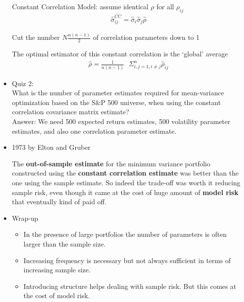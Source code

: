 \documentclass{maths}
\begin{document}
\begin{itemize}
Constant Correlation Model: assume identical $\rho$ for all $\rho_{ij}$
\begin{align*}
\hat{\sigma}_{ij}^{CC} = \hat{\sigma}_{i}\hat{\sigma}_{j}\hat{\rho}
\end{align*}

Cut the number $N\frac{n(n-1)}{2}$ of correlation parameters down to 1

The optimal estimator of this constant correlation is the `global' average
\begin{align*}
\hat{\rho}=\frac{1}{n(n-1)}\text{ }\Sigma_{i,j=1,i \neq j}^{n}\hat{\rho}_{ij}
\end{align*}


\item Quiz 2:\\ What is the number of parameter estimates required for mean-variance optimization based on the S\&P 500 universe, when using the constant correlation covariance matrix estimate?\\

Answer: We need 500 expected return estimates, 500 volatility parameter estimates, and also one correlation parameter estimate.\\

\item 1973 by Elton and Gruber

The \textbf{out-of-sample estimate} for the minimum variance portfolio constructed using the \textbf{constant correlation estimate} was better than the one using the sample estimate. So indeed the trade-off was worth it reducing sample risk, even though it came at the cost of huge amount of \textbf{model risk} that eventually kind of paid off.\\
 
\item Wrap-up
\begin{itemize}
\item In the presence of large portfolios the number of parameters is often larger than the sample size.

\item Increasing frequency is necessary but not always sufficient in terms of increasing sample size.

\item Introducing structure helps dealing with sample risk. But this comes at the cost of model risk.


\end{itemize}
 

\end{itemize}
\end{document}
